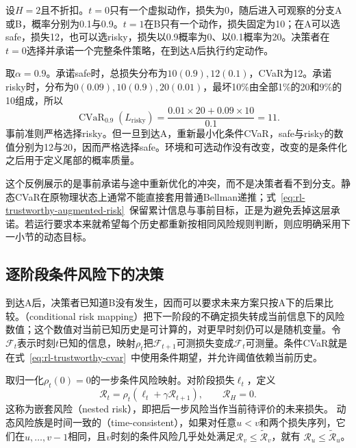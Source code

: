 \begin{example}[静态CVaR的时间不一致]
  \label{ex:rl-trustworthy-time-inconsistency}
  设$H=2$且不折扣。$t=0$只有一个虚拟动作，损失为0，随后进入可观察的分支A或B，概率分别为0.1与0.9。$t=1$在B只有一个动作，损失固定为10；在A可以选safe，损失12，也可以选risky，损失以0.9概率为0、以0.1概率为20。决策者在$t=0$选择并承诺一个完整条件策略，在到达A后执行约定动作。

  取$\alpha=0.9$。承诺safe时，总损失分布为$10(0.9),12(0.1)$，CVaR为12。承诺risky时，分布为$0(0.09),10(0.9),20(0.01)$，最坏10\%由全部1\%的20和9\%的10组成，所以
  \[
    \operatorname{CVaR}_{0.9}(L_{\text{risky}})
       =\frac{0.01\times20+0.09\times10}{0.1}=11.
  \]
  事前准则严格选择risky。但一旦到达A，重新最小化条件CVaR，safe与risky的数值分别为12与20，因而严格选择safe。环境和可选动作没有改变，改变的是条件化之后用于定义尾部的概率质量。
\end{example}

这个反例展示的是事前承诺与途中重新优化的冲突，而不是决策者看不到分支。静态CVaR在原物理状态上通常不能直接套用普通Bellman递推；式~\eqref{eq:rl-trustworthy-augmented-risk}~保留累计信息与事前目标，正是为避免丢掉这层承诺。若运行要求本来就希望每个历史都重新按相同风险规则判断，则应明确采用下一小节的动态目标。

\subsection{逐阶段条件风险下的决策}
\label{sec:rl-trustworthy-dynamic-risk}

到达A后，决策者已知道B没有发生，因而可以要求未来方案只按A下的后果比较。（conditional risk mapping）把下一阶段的不确定损失转成当前信息下的风险数值；这个数值对当前已知历史是可计算的，对更早时刻仍可以是随机变量。令$\mathcal F_t$表示时刻$t$已知的信息，映射$\rho_t$把$\mathcal F_{t+1}$可测损失变成$\mathcal F_t$可测量。条件CVaR就是在式~\eqref{eq:rl-trustworthy-cvar}~中使用条件期望，并允许阈值依赖当前历史。

\begin{definition}[嵌套风险与时间一致性]
  \label{def:rl-trustworthy-time-consistency}
  取归一化$\rho_t(0)=0$的一步条件风险映射。对阶段损失$\ell_t$，定义
  \[
    \mathcal R_t
      =\rho_t(\ell_t+\gamma\mathcal R_{t+1}),
      \qquad \mathcal R_H=0.
  \]
  这称为嵌套风险（nested risk），即把后一步风险当作当前待评价的未来损失。
  动态风险族是时间一致的（time-consistent），如果对任意$u<v$和两个损失序列，它们在$u,\ldots,v-1$相同，且$v$时刻的条件风险几乎处处满足$\mathcal R_v\leq\widetilde{\mathcal R}_v$，就有
  $\mathcal R_u\leq\widetilde{\mathcal R}_u$。
\end{definition}

